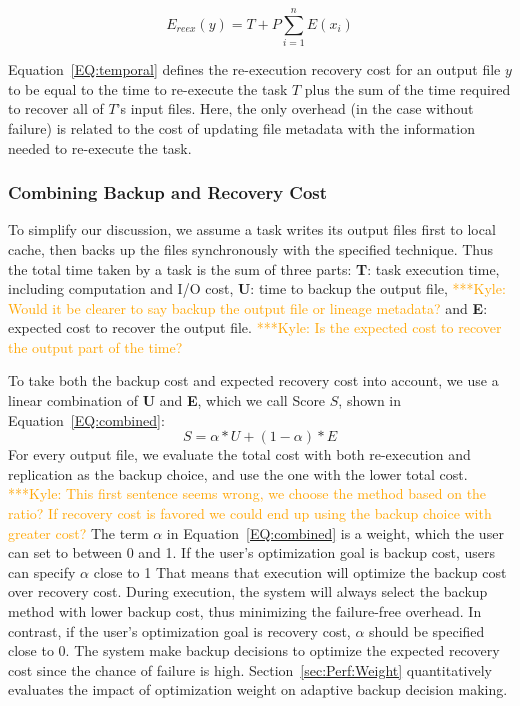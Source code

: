 \documentclass{sig-alternate}
\newcommand{\iannote}[1]{ {\textcolor{red}    { ***Ian:      #1 }}}
\newcommand{\katznote}[1]{ {\textcolor{blue}    { ***Dan:      #1 }}}
\newcommand{\zhaonote}[1]{{\textcolor{cyan}    { ***Zhao:      #1 }}}
\newcommand{\kylenote}[1]{{\textcolor{orange}    { ***Kyle:      #1 }}}
\newcommand{\iannote}[1]{}
\newcommand{\katznote}[1]{}
\newcommand{\zhaonote}[1]{}
\newcommand{\kylenote}[1]{}
\begin{document}
\begin{equation}
E_{reex}(y) = T+P\sum_{i=1}^{n}E(x_i)
\label{EQ:temporal}
\end{equation}

Equation~\ref{EQ:temporal} defines the re-execution recovery cost for an output file $y$ to be
equal to the time to re-execute the task $T$ plus the sum of the time required to recover all of $T$'s
input files. Here, the only overhead (in the case without failure) is related to 
the cost of updating file metadata with the information needed to re-execute the task.

\subsubsection{Combining Backup and Recovery Cost}
To simplify our discussion, we assume a task writes its output files first to local cache, then backs up the files synchronously with the specified technique. Thus the total time taken by a task is the sum of three parts:
{\bf T}: task execution time, including computation and I/O cost,
{\bf U}: time to backup the output file,\kylenote{Would it be clearer to say backup the output file or lineage metadata?}
and {\bf E}: expected cost to recover the output file.\kylenote{Is the expected cost to recover the output part of the time?}

To take both the backup cost and expected recovery cost into account, we use a linear combination of {\bf U} and {\bf E}, which we call %
Score $S$, shown in Equation~\ref{EQ:combined}:
\begin{equation}
S=\alpha*U+(1-\alpha)*E
\label{EQ:combined}
\end{equation}
%
For every output file, we evaluate the total cost with both re-execution and replication as the backup choice, and use the one with the lower total cost.
\kylenote{This first sentence seems wrong, we choose the method based on the ratio? If recovery cost is favored we could end up using the backup choice with greater cost?} 
The term $\alpha$ in Equation~\ref{EQ:combined} is a weight, which the user can set to between 0 and 1. 
 If the user's optimization goal is backup cost, users can specify $\alpha$ close to 1
That means that execution will optimize the backup cost over recovery cost. 
During execution, the system will always select the backup method with lower backup cost, thus minimizing the failure-free overhead.
In contrast, if the user's optimization goal is recovery cost, $\alpha$ should be specified close to 0. 
The system make backup decisions to optimize the expected recovery cost since the chance of failure is high. 
Section~\ref{sec:Perf:Weight} quantitatively evaluates the impact of optimization weight on adaptive backup decision making. 
\end{document}
